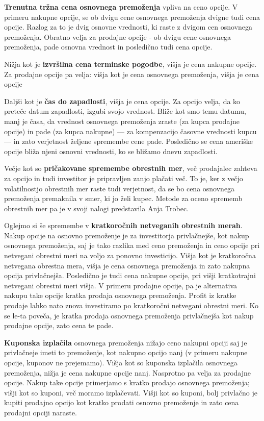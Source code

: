 \documentclass[a4paper]{article}
\begin{document}
\textbf{Trenutna tržna cena osnovnega premoženja} vpliva na ceno opcije. V primeru nakupne opcije, se ob dvigu cene osnovnega premoženja
dvigne tudi cena opcije. Razlog za to je dvig osnovne vrednosti, ki raste z dvigom cen osnovnega premoženja. Obratno velja za prodajne
opcije - ob dvigu cene osnovnega premoženja, pade osnovna vrednost in posledično tudi cena opcije.

Nižja kot je \textbf{izvršilna cena terminske pogodbe}, višja je cena nakupne opcije. Za prodajne opcije pa velja: višja kot je cena 
osnovnega premoženja, višja je cena opcije

Daljši kot je \textbf{čas do zapadlosti}, višja je cena opcije. Za opcijo velja, da ko preteče datum zapadlosti, izgubi svojo vrednost.
Bliže kot smo temu datumu, manj je časa, da vrednost osnovnega premoženja zraste (za kupca prodajne opcije) in pade (za kupca nakupne) ---
za kompenzacijo časovne vrednosti kupcu --- in zato verjetnost željene spremembe cene pade. Posledično se cena ameriške opcije bliža njeni
osnovni vrednosti, ko se bližamo dnevu zapadlosti.

Večje kot so \textbf{pričakovane spremembe obrestnih mer}, več prodajalec zahteva za opcijo in tudi investitor je pripravljen
zanjo plačati več. To je, ker z večjo volatilnostjo obrestnih mer raste tudi verjetnost, da se bo cena osnovnega premoženja premaknila
v smer, ki jo želi kupec. Metode za oceno sprememb obrestnih mer pa je v svoji nalogi predstavila Anja Trobec.

Oglejmo si še spremembe v \textbf{kratkoročnih netveganih obrestnih merah}. Nakup opcije na osnovno premoženje 
je za investitorja privlačnejše, kot nakup osnovnega premoženja, saj je tako razlika med ceno 
premoženja in ceno opcije pri netvegani obrestni meri na voljo za ponovno investicijo. Višja kot je kratkoročna netvegana 
obrestna mera, višja je cena osnovnega premoženja in zato nakupna opcija privlačnejša. Posledično je tudi cena nakupne opcije, pri 
višji kratkotrajni netvegani obrestni meri višja. V primeru prodajne opcije, pa je alternativa nakupu take opcije kratka prodaja
osnovnega premoženja. Profit iz kratke prodaje lahko nato znova investiramo po kratkoročni netvegani obrestni meri. Ko se le-ta poveča,
je kratka prodaja osnovnega premoženja privlačnejša kot nakup prodajne opcije, zato cena te pade.

\textbf{Kuponska izplačila} osnovnega premoženja nižajo ceno nakupni opciji saj je privlačneje imeti to premoženje, kot nakupno 
opcijo nanj (v primeru nakupne opcije, kuponov ne prejemamo). Višja kot so kuponska izplačila osnovnega premoženja, nižja je cena
nakupne opcije nanj. Nasprotno pa velja za prodajne opcije. Nakup take opcije primerjamo s kratko prodajo osnovnega premoženja;
višji kot so kuponi, več moramo izplačevati. Višji kot so kuponi, bolj privlačno je kupiti prodajno opcijo kot kratko prodati osnovno
premoženje in zato cena prodajni opciji naraste.
\end{document}
